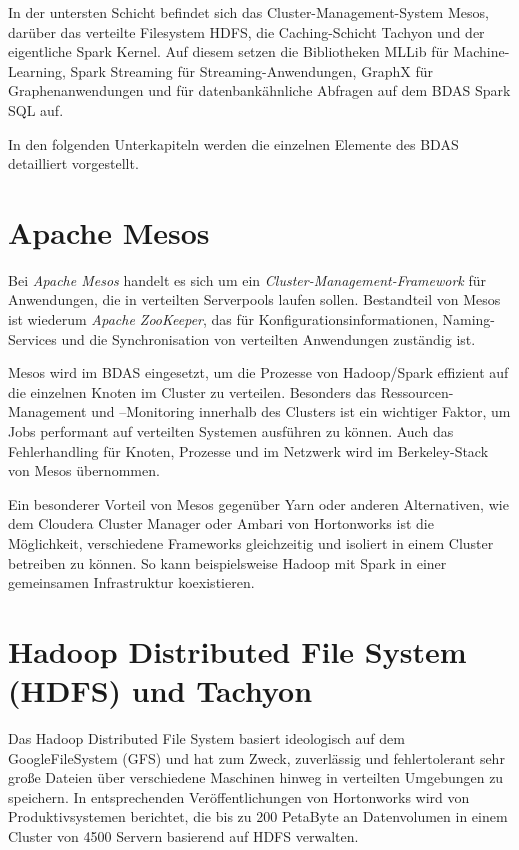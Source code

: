 In der untersten Schicht befindet sich das Cluster-Management-System Mesos, darüber das verteilte Filesystem HDFS, die Caching-Schicht Tachyon und der eigentliche Spark Kernel. Auf diesem setzen die Bibliotheken MLLib für Machine-Learning, Spark Streaming für Streaming-Anwendungen, GraphX für Graphenanwendungen und für datenbankähnliche Abfragen auf dem BDAS Spark SQL auf. 

In den folgenden Unterkapiteln werden die einzelnen Elemente des BDAS detailliert vorgestellt.   
\newpage

\section{Apache Mesos}
\label{section:apache Mesos}


Bei \textit{Apache Mesos} handelt es sich um ein \textit{Cluster-Management-Framework} für Anwendungen, die in verteilten Serverpools laufen sollen. Bestandteil von Mesos ist wiederum \textit{Apache ZooKeeper}, das für Konfigurationsinformationen, Naming-Services und die Synchronisation von verteilten Anwendungen zuständig ist.  

Mesos wird im BDAS eingesetzt, um die Prozesse von Hadoop/Spark effizient auf die einzelnen Knoten im Cluster zu verteilen. Besonders das Ressourcen-Management und –Monitoring innerhalb des Clusters ist ein wichtiger Faktor, um Jobs performant auf verteilten Systemen ausführen zu können. Auch das Fehlerhandling für Knoten, Prozesse und im Netzwerk wird im Berkeley-Stack von Mesos übernommen. 

Ein besonderer Vorteil von Mesos gegenüber Yarn oder anderen Alternativen, wie dem Cloudera Cluster Manager oder Ambari von Hortonworks ist die Möglichkeit, verschiedene Frameworks gleichzeitig und isoliert in einem Cluster betreiben zu können. So kann beispielsweise Hadoop mit Spark in einer gemeinsamen Infrastruktur koexistieren.   
	
\section{Hadoop Distributed File System (HDFS) und Tachyon}
\label{section:hadoop Distributed File System (HDFS) und Tachyon}


Das Hadoop Distributed File System basiert ideologisch auf dem GoogleFileSystem (GFS) und hat zum Zweck, zuverlässig und fehlertolerant sehr große Dateien über verschiedene Maschinen hinweg in verteilten Umgebungen zu speichern. In entsprechenden Veröffentlichungen von Hortonworks  wird von Produktivsystemen berichtet, die bis zu 200 PetaByte an Datenvolumen in einem Cluster von 4500 Servern basierend auf HDFS verwalten.

